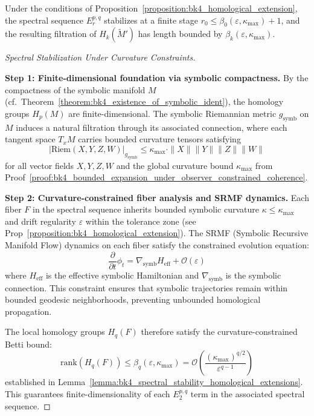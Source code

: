 \begin{lemma}
\label{lemma:bk4_spectral_stability_homological_extensions}
Under the conditions of Proposition~\ref{proposition:bk4_homological_extension}, the spectral sequence $E_r^{p,q}$ stabilizes at a finite stage $r_0 \leq \beta_0(\varepsilon, \kappa_{\max}) + 1$, and the resulting filtration of $H_k(\widetilde{M}')$ has length bounded by $\beta_k(\varepsilon, \kappa_{\max})$.
\end{lemma}

\begin{proof}[Spectral Stabilization Under Curvature Constraints]
\label{proof:bk4_spectral_stability}
\leavevmode

\textbf{Step 1: Finite-dimensional foundation via symbolic compactness.}
By the compactness of the symbolic manifold $M$ (cf.~Theorem~\ref{theorem:bk4_existence_of_symbolic_ident}), the homology groups $H_p(M)$ are finite-dimensional. The symbolic Riemannian metric $g_{\text{symb}}$ on $M$ induces a natural filtration through its associated connection, where each tangent space $T_x M$ carries bounded curvature tensors satisfying
\begin{equation}
|\text{Riem}(X,Y,Z,W)|_{g_{\text{symb}}} \leq \kappa_{\max} \cdot \|X\| \|Y\| \|Z\| \|W\|
\end{equation}
for all vector fields $X,Y,Z,W$ and the global curvature bound $\kappa_{\max}$ from Proof~\ref{proof:bk4_bounded_expansion_under_observer_constrained_coherence}.

\textbf{Step 2: Curvature-constrained fiber analysis and SRMF dynamics.}
Each fiber $F$ in the spectral sequence inherits bounded symbolic curvature $\kappa \leq \kappa_{\max}$ and drift regularity $\varepsilon$ within the tolerance zone (see Prop~\ref{proposition:bk4_homological_extension}). The SRMF (Symbolic Recursive Manifold Flow) dynamics on each fiber satisfy the constrained evolution equation:
\begin{equation}
\frac{\partial}{\partial t} \phi_t = \nabla_{\text{symb}} H_{\text{eff}} + \mathcal{O}(\varepsilon)
\end{equation}
where $H_{\text{eff}}$ is the effective symbolic Hamiltonian and $\nabla_{\text{symb}}$ is the symbolic connection. This constraint ensures that symbolic trajectories remain within bounded geodesic neighborhoods, preventing unbounded homological propagation.

The local homology groups $H_q(F)$ therefore satisfy the curvature-constrained Betti bound:
\begin{equation}
\text{rank}(H_q(F)) \leq \beta_q(\varepsilon, \kappa_{\max}) = \mathcal{O}\left(\frac{(\kappa_{\max})^{q/2}}{\varepsilon^{q-1}}\right)
\end{equation}
established in Lemma~\ref{lemma:bk4_spectral_stability_homological_extensions}. This guarantees finite-dimensionality of each $E_2^{p,q}$ term in the associated spectral sequence.


\end{proof}
